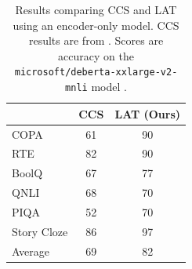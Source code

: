 \begin{table}[H]

\centering
\begin{tabular}{@{}lcc@{}}
\toprule
            & \multicolumn{1}{l}{CCS} & \multicolumn{1}{l}{LAT (Ours)} \\ \midrule
COPA  \citep{roemmele2011choice}      & 61                      & 90                      \\
RTE  \citep{glue}       & 82                      & 90                      \\
BoolQ \citep{clark2019boolq}      & 67                      & 77                      \\
QNLI \citep{glue}       & 68                      & 70                      \\
PIQA \citep{piqa}       & 52                      & 70                      \\
Story Cloze  \citep{mostafazadeh2017lsdsem} & 86                      & 97                      \\ \midrule
Average     & 69                      & 82                      \\ \bottomrule
\end{tabular}
\caption{Results comparing CCS and LAT using an encoder-only model. CCS results are from \cite{burns2022discovering}. Scores are accuracy on the \texttt{microsoft/deberta-xxlarge-v2-mnli} model \citep{deberta}.}
\label{tab:ccs_results}
\end{table}
